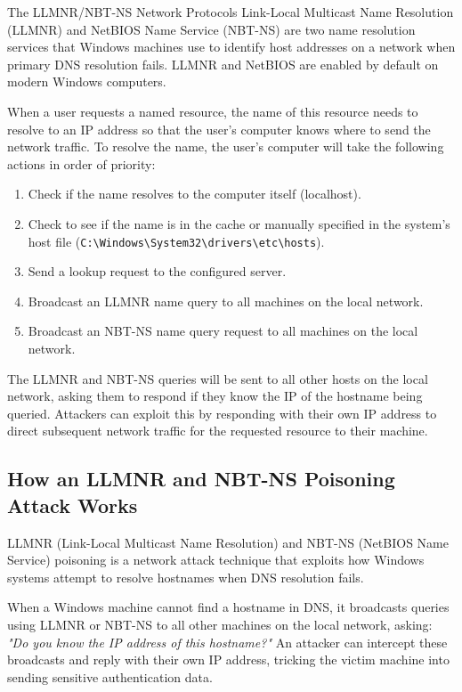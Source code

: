 The LLMNR/NBT-NS Network Protocols
Link-Local Multicast Name Resolution (LLMNR) and NetBIOS Name Service (NBT-NS) are two name resolution services that Windows machines use to identify host addresses on a network when primary DNS resolution fails. LLMNR and NetBIOS are enabled by default on modern Windows computers.

When a user requests a named resource, the name of this resource needs to resolve to an IP address so that the user's computer knows where to send the network traffic. To resolve the name, the user's computer will take the following actions in order of priority:

\begin{enumerate}
    \item Check if the name resolves to the computer itself (localhost).
    \item Check to see if the name is in the cache or manually specified in the system's host file (\verb|C:\Windows\System32\drivers\etc\hosts|).
    \item Send a lookup request to the configured server.
    \item Broadcast an LLMNR name query to all machines on the local network.
    \item Broadcast an NBT-NS name query request to all machines on the local network.
\end{enumerate}

The LLMNR and NBT-NS queries will be sent to all other hosts on the local network, asking them to respond if they know the IP of the hostname being queried. Attackers can exploit this by responding with their own IP address to direct subsequent network traffic for the requested resource to their machine.

\subsection{How an LLMNR and NBT-NS Poisoning Attack Works}
LLMNR (Link-Local Multicast Name Resolution) and NBT-NS (NetBIOS Name Service) poisoning is a network attack technique that exploits how Windows systems attempt to resolve hostnames when DNS resolution fails.

When a Windows machine cannot find a hostname in DNS, it broadcasts queries using LLMNR or NBT-NS to all other machines on the local network, asking: \textit{"Do you know the IP address of this hostname?"} An attacker can intercept these broadcasts and reply with their own IP address, tricking the victim machine into sending sensitive authentication data.


